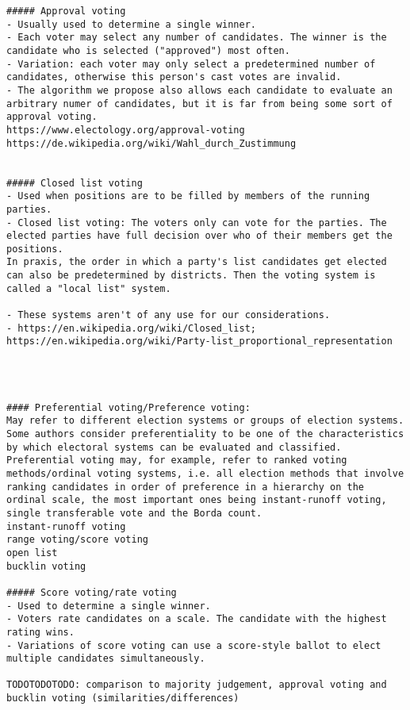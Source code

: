 \begin{enumerate}
{{\begin{verbatim}
##### Approval voting
- Usually used to determine a single winner. 
- Each voter may select any number of candidates. The winner is the candidate who is selected ("approved") most often. 
- Variation: each voter may only select a predetermined number of candidates, otherwise this person's cast votes are invalid. 
- The algorithm we propose also allows each candidate to evaluate an arbitrary numer of candidates, but it is far from being some sort of approval voting. 
https://www.electology.org/approval-voting
https://de.wikipedia.org/wiki/Wahl_durch_Zustimmung


##### Closed list voting
- Used when positions are to be filled by members of the running parties. 
- Closed list voting: The voters only can vote for the parties. The elected parties have full decision over who of their members get the positions. 
In praxis, the order in which a party's list candidates get elected can also be predetermined by districts. Then the voting system is called a "local list" system.  

- These systems aren't of any use for our considerations. 
- https://en.wikipedia.org/wiki/Closed_list; https://en.wikipedia.org/wiki/Party-list_proportional_representation




#### Preferential voting/Preference voting: 
May refer to different election systems or groups of election systems. Some authors consider preferentiality to be one of the characteristics by which electoral systems can be evaluated and classified. 
Preferential voting may, for example, refer to ranked voting methods/ordinal voting systems, i.e. all election methods that involve ranking candidates in order of preference in a hierarchy on the ordinal scale, the most important ones being instant-runoff voting, single transferable vote and the Borda count. 
instant-runoff voting
range voting/score voting
open list
bucklin voting

##### Score voting/rate voting 
- Used to determine a single winner. 
- Voters rate candidates on a scale. The candidate with the highest rating wins.  
- Variations of score voting can use a score-style ballot to elect multiple candidates simultaneously.

TODOTODOTODO: comparison to majority judgement, approval voting and bucklin voting (similarities/differences)


\end{verbatim}}}
\end{enumerate}
